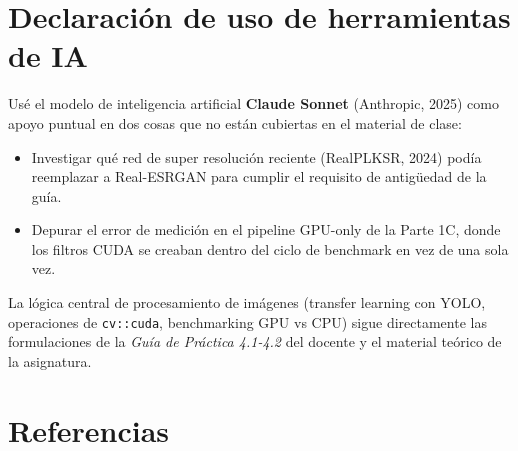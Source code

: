 \documentclass[12pt,a4paper]{article}
\begin{document}
\section*{Declaración de uso de herramientas de IA}

Usé el modelo de inteligencia artificial \textbf{Claude Sonnet} (Anthropic, 2025) como apoyo puntual en dos cosas que no están cubiertas en el material de clase:

\begin{itemize}
  \item Investigar qué red de super resolución reciente (RealPLKSR, 2024) podía reemplazar a Real-ESRGAN para cumplir el requisito de antigüedad de la guía.
  \item Depurar el error de medición en el pipeline GPU-only de la Parte 1C, donde los filtros CUDA se creaban dentro del ciclo de benchmark en vez de una sola vez.
\end{itemize}

La lógica central de procesamiento de imágenes (transfer learning con YOLO, operaciones de \texttt{cv::cuda}, benchmarking GPU vs CPU) sigue directamente las formulaciones de la \textit{Guía de Práctica 4.1-4.2} del docente y el material teórico de la asignatura.

\section*{Referencias}
\end{document}
